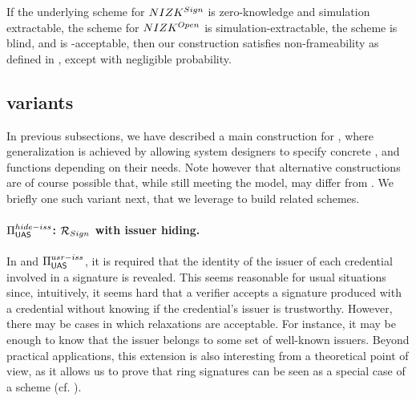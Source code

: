 \begin{theorem}
  \label{thm:frame-uas}
  If the underlying scheme for $NIZK^{Sign}$ is zero-knowledge and simulation
  extractable, the scheme for $NIZK^{Open}$ is simulation-extractable, the
  \SBCM scheme is blind, and \fissue is \UAS-acceptable, then our \CUASGen
  construction satisfies non-frameability as defined in ,
  except with negligible probability.
\end{theorem}



\subsection{\CUASGen variants}
\label{ssec:variants}

In previous subsections, we have described a main construction for \CUASGen,
where generalization is achieved by allowing system designers to specify
concrete \fissue, \feval and \finsp functions depending on their needs. Note
however that alternative constructions are of course possible that, while
still meeting the \UAS model, may differ from \CUASGen. We briefly one such
variant next, that we leverage to build related schemes.


\paragraph{$\Pi_{\mathsf{UAS}}^{hide-iss}$: $\mathcal{R}_{Sign}$ with issuer hiding.} %
In \CUASGen and $\Pi_{\mathsf{UAS}}^{usr-iss}$, it is required that the identity of the
issuer of each credential involved in a signature is revealed. This seems
reasonable for usual situations since, intuitively, it seems hard that a
verifier accepts a signature produced with a credential without knowing if the
credential's issuer is trustworthy. However, there may be cases in which
relaxations are acceptable. For instance, it may be enough to know that the
issuer belongs to some set of well-known issuers. Beyond practical applications,
this extension is also interesting from a theoretical point of view, as it
allows us to prove that ring signatures can be seen as a special case of a \UAS
scheme (cf. ). 


